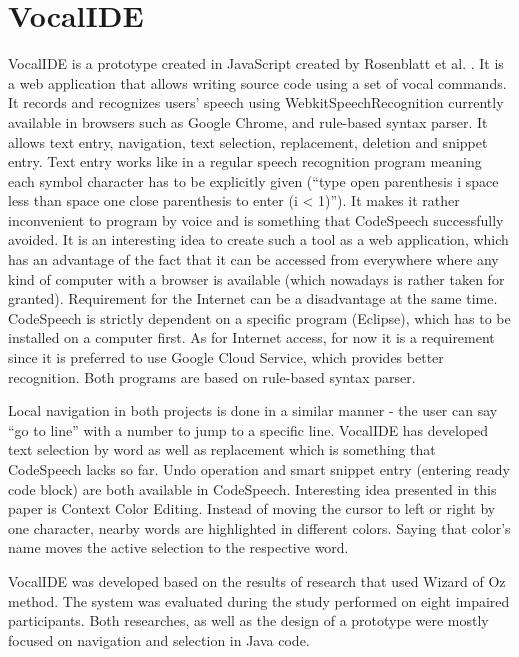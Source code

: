 \section{VocalIDE}
VocalIDE is a prototype created in JavaScript created by Rosenblatt et al. \cite{Rosenblatt2018}. It is a web application that allows writing source code using a set of vocal commands. It records and recognizes users' speech using WebkitSpeechRecognition currently available in browsers such as \eg Google Chrome, and rule-based syntax parser. It allows text entry, navigation, text selection, replacement, deletion and snippet entry. Text entry works like in a regular speech recognition program meaning each symbol character has to be explicitly given (``type open parenthesis i space less than space one close parenthesis to enter (i < 1)''). It makes it rather inconvenient to program by voice and is something that CodeSpeech successfully avoided. It is an interesting idea to create such a tool as a web application, which has an advantage of the fact that it can be accessed from everywhere where any kind of computer with a browser is available (which nowadays is rather taken for granted). Requirement for the Internet can be a disadvantage at the same time. CodeSpeech is strictly dependent on a specific program (Eclipse), which has to be installed on a computer first. As for Internet access, for now it is a requirement since it is preferred to use Google Cloud Service, which provides better recognition. Both programs are based on rule-based syntax parser.

Local navigation in both projects is done in a similar manner - the user can say ``go to line'' with a number to jump to a specific line. VocalIDE has developed text selection by word as well as replacement which is something that CodeSpeech lacks so far. Undo operation and smart snippet entry (entering ready code block) are both available in CodeSpeech. Interesting idea presented in this paper is Context Color Editing. Instead of moving the cursor to left or right by one character, nearby words are highlighted in different colors. Saying that color's name moves the active selection to the respective word.

VocalIDE was developed based on the results of research that used Wizard of Oz method. The system was evaluated during the study performed on eight impaired participants. Both researches, as well as the design of a prototype were mostly focused on navigation and selection in Java code.


